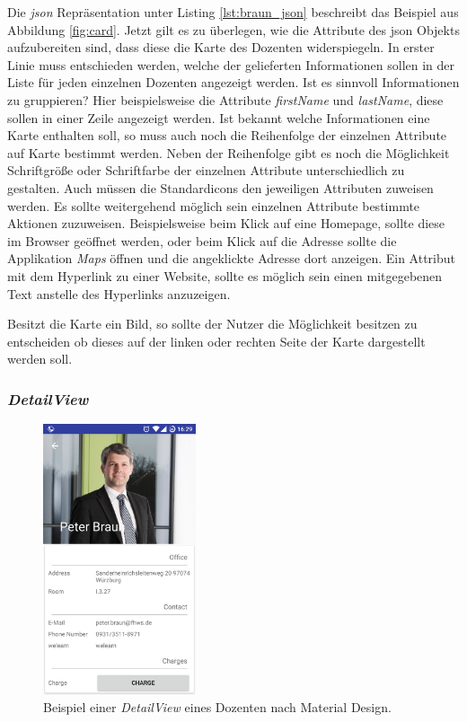 Die  \textit{\acf{json}} Repräsentation unter Listing \ref{lst:braun_json} beschreibt das Beispiel aus Abbildung \ref{fig:card}.
Jetzt gilt es zu überlegen, wie die Attribute des \ac{json} Objekts aufzubereiten sind, dass diese die Karte des Dozenten widerspiegeln. 
In erster Linie muss entschieden werden, welche der gelieferten Informationen sollen in der Liste für jeden einzelnen Dozenten angezeigt werden. Ist es sinnvoll Informationen zu gruppieren? Hier beispielsweise die Attribute \textit{firstName} und \textit{lastName}, diese sollen in einer Zeile angezeigt werden. Ist bekannt welche Informationen eine Karte enthalten soll, so muss auch noch die Reihenfolge der einzelnen Attribute auf Karte bestimmt werden.
Neben der Reihenfolge gibt es noch die Möglichkeit Schriftgröße oder Schriftfarbe der einzelnen Attribute unterschiedlich zu gestalten. Auch müssen die Standardicons den jeweiligen Attributen zuweisen werden. Es sollte weitergehend möglich sein einzelnen Attribute bestimmte Aktionen zuzuweisen. Beispielsweise beim Klick auf eine Homepage, sollte diese im Browser geöffnet werden, oder beim Klick auf die Adresse sollte die Applikation \textit{Maps} öffnen und die angeklickte Adresse dort anzeigen. Ein Attribut mit dem Hyperlink zu einer Website, sollte es möglich sein einen mitgegebenen Text anstelle des Hyperlinks anzuzeigen. 

Besitzt die Karte ein Bild, so sollte der Nutzer die Möglichkeit besitzen zu entscheiden ob dieses auf der linken oder rechten Seite der Karte dargestellt werden soll.

\subsubsection{\textit{DetailView}}

\begin{figure}[H]
	\begin{center}
		\includegraphics[width=0.4\textwidth]{images/detail.png}
		\caption{Beispiel einer \textit{DetailView} eines Dozenten nach Material Design.}
		\label{fig:detail}
	\end{center}
\end{figure}

